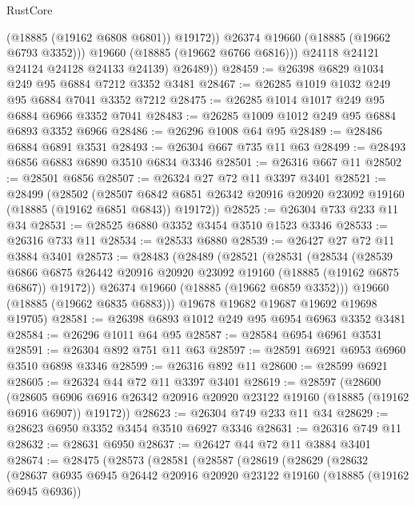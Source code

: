 \begin{lexlean}{RustCore}
\begin{coremodule}
                  (@18885 (@19162 @6808 @6801))
                  @19172))
              @26374
              @19660
              (@18885 (@19662 @6793 @3352)))
            @19660
            (@18885 (@19662 @6766 @6816)))
          @24118
          @24121
          @24124
          @24128
          @24133
          @24139)
        @26489))
@28459 := @26398 @6829 @1034 @249 @95 @6884 @7212 @3352 @3481
@28467 := @26285 @1019 @1032 @249 @95 @6884 @7041 @3352 @7212
@28475 := @26285 @1014 @1017 @249 @95 @6884 @6966 @3352 @7041
@28483 := @26285 @1009 @1012 @249 @95 @6884 @6893 @3352 @6966
@28486 := @26296 @1008 @64 @95
@28489 := @28486 @6884 @6891 @3531
@28493 := @26304 @667 @735 @11 @63
@28499 := @28493 @6856 @6883 @6890 @3510 @6834 @3346
@28501 := @26316 @667 @11
@28502 := @28501 @6856
@28507 := @26324 @27 @72 @11 @3397 @3401
@28521 := @28499
    (@28502
      (@28507 @6842 @6851 @26342 @20916 @20920 @23092 @19160 (@18885 (@19162 @6851 @6843)) @19172))
@28525 := @26304 @733 @233 @11 @34
@28531 := @28525 @6880 @3352 @3454 @3510 @1523 @3346
@28533 := @26316 @733 @11
@28534 := @28533 @6880
@28539 := @26427 @27 @72 @11 @3884 @3401
@28573 := @28483
    (@28489
      (@28521
        (@28531
          (@28534
            (@28539
              @6866
              @6875
              @26442
              @20916
              @20920
              @23092
              @19160
              (@18885 (@19162 @6875 @6867))
              @19172))
          @26374
          @19660
          (@18885 (@19662 @6859 @3352)))
        @19660
        (@18885 (@19662 @6835 @6883)))
      @19678
      @19682
      @19687
      @19692
      @19698
      @19705)
@28581 := @26398 @6893 @1012 @249 @95 @6954 @6963 @3352 @3481
@28584 := @26296 @1011 @64 @95
@28587 := @28584 @6954 @6961 @3531
@28591 := @26304 @892 @751 @11 @63
@28597 := @28591 @6921 @6953 @6960 @3510 @6898 @3346
@28599 := @26316 @892 @11
@28600 := @28599 @6921
@28605 := @26324 @44 @72 @11 @3397 @3401
@28619 := @28597
    (@28600
      (@28605 @6906 @6916 @26342 @20916 @20920 @23122 @19160 (@18885 (@19162 @6916 @6907)) @19172))
@28623 := @26304 @749 @233 @11 @34
@28629 := @28623 @6950 @3352 @3454 @3510 @6927 @3346
@28631 := @26316 @749 @11
@28632 := @28631 @6950
@28637 := @26427 @44 @72 @11 @3884 @3401
@28674 := @28475
    (@28573
      (@28581
        (@28587
          (@28619
            (@28629
              (@28632
                (@28637
                  @6935
                  @6945
                  @26442
                  @20916
                  @20920
                  @23122
                  @19160
                  (@18885 (@19162 @6945 @6936))

\end{coremodule}
\end{lexlean}
